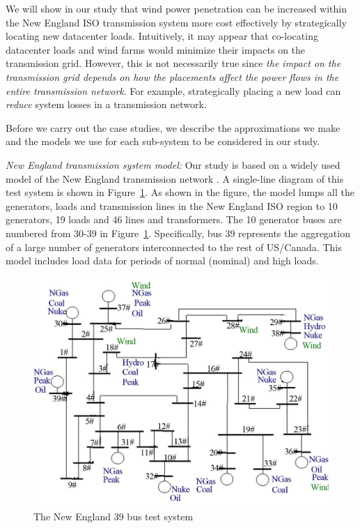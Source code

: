 We will show in our study that wind power penetration can be increased
within the New England ISO transmission system more cost effectively
by strategically locating new datacenter loads. Intuitively, it may
appear that co-locating datacenter loads and wind farms would minimize
their impacts on the transmission grid.  However, this is not
necessarily true since {\em the impact on the transmission grid
  depends on how the placements affect the power flows in the entire
  transmission network}.  For example, strategically placing a new load
can {\em reduce} system losses in a transmission network.

Before we carry out the case studies, we describe the approximations
we make and the models we use for each sub-system to be considered in our
study. 

{\em New England transmission system model:} Our study is based on a
widely used model of the New England transmission network
\cite{bills1970line}. A single-line diagram of this test system is
shown in Figure~\ref{fig:newengland}. As shown in the figure, the
model lumps all the generators, loads and transmission lines in the
New England ISO region to 10 generators, 19 loads and 46 lines and
transformers. The 10 generator buses are numbered from 30-39 in
Figure~\ref{fig:newengland}. Specifically, bus 39 represents the
aggregation of a large number of generators interconnected to the rest of
US/Canada.  This model includes load data for periods of normal
(nominal) and high loads.

\begin{figure}[ht]
\centering
\includegraphics[width=1\columnwidth]{img/newEngland.jpg}
\caption{The New England 39 bus test system}
\label{fig:newengland}
\end{figure}

